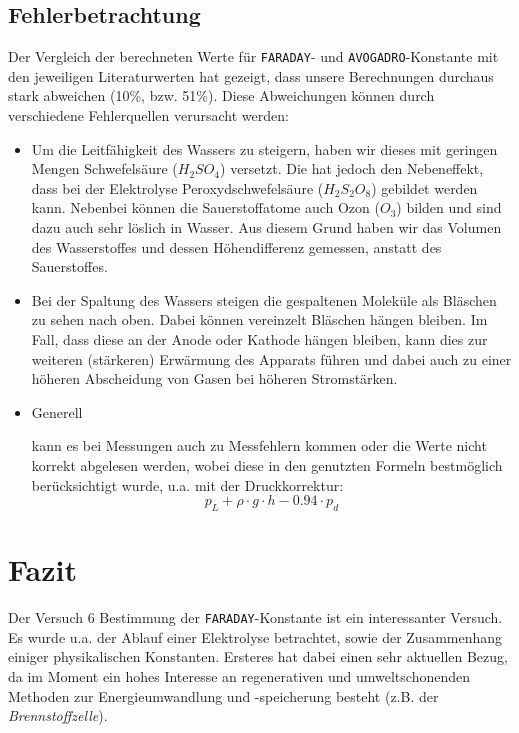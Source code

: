 \documentclass[10pt,a4paper]{article}
\newcommand{\vnr}{6}
\begin{document}
\subsection{Fehlerbetrachtung}
\begin{flushleft}
Der Vergleich der berechneten Werte für \texttt{FARADAY}- und \texttt{AVOGADRO}-Konstante mit den jeweiligen Literaturwerten hat gezeigt, dass unsere Berechnungen durchaus stark abweichen (10\%, bzw. 51\%). Diese Abweichungen können durch verschiedene Fehlerquellen verursacht werden:

\begin{itemize}
\item Um die Leitfähigkeit des Wassers zu steigern, haben wir dieses mit geringen Mengen Schwefelsäure ($H_2SO_4$) versetzt. Die hat jedoch den Nebeneffekt, dass bei der Elektrolyse Peroxydschwefelsäure ($H_2S_2O_8$) gebildet werden kann. Nebenbei können die Sauerstoffatome auch Ozon ($O_3$) bilden und sind dazu auch sehr löslich in Wasser. Aus diesem Grund haben wir das Volumen des Wasserstoffes und dessen Höhendifferenz gemessen, anstatt des Sauerstoffes.
\item Bei der Spaltung des Wassers steigen die gespaltenen Moleküle als Bläschen zu sehen nach oben. Dabei können vereinzelt Bläschen hängen bleiben. Im Fall, dass diese an der Anode oder Kathode hängen bleiben, kann dies zur weiteren (stärkeren) Erwärmung des Apparats führen und dabei auch zu einer höheren Abscheidung von Gasen bei höheren Stromstärken.
\item \hypertarget{Dkorr}{Generell} kann es bei Messungen auch zu Messfehlern kommen oder die Werte nicht korrekt abgelesen werden, wobei diese in den genutzten Formeln bestmöglich berücksichtigt wurde, u.a. mit der Druckkorrektur:
\begin{equation*}
p_L + \rho \cdot g \cdot h - 0.94 \cdot p_d
\end{equation*}
\end{itemize}
\end{flushleft}

\section{Fazit}
\begin{flushleft}
Der Versuch \vnr \hspace{1pt} \glqq Bestimmung der \texttt{FARADAY}-Konstante\grqq \hspace{1pt} ist ein interessanter Versuch. Es wurde u.a. der Ablauf einer Elektrolyse betrachtet, sowie der Zusammenhang einiger physikalischen Konstanten. Ersteres hat dabei einen sehr aktuellen Bezug, da im Moment ein hohes Interesse an regenerativen und umweltschonenden Methoden zur Energieumwandlung und -speicherung besteht (z.B. der \textit{Brennstoffzelle}).
\end{flushleft}

\begingroup
\raggedright
\sloppy
\printbibliography[heading=bibintoc,title={7 \hspace{6pt} Literatur}]
\endgroup
\end{document}
